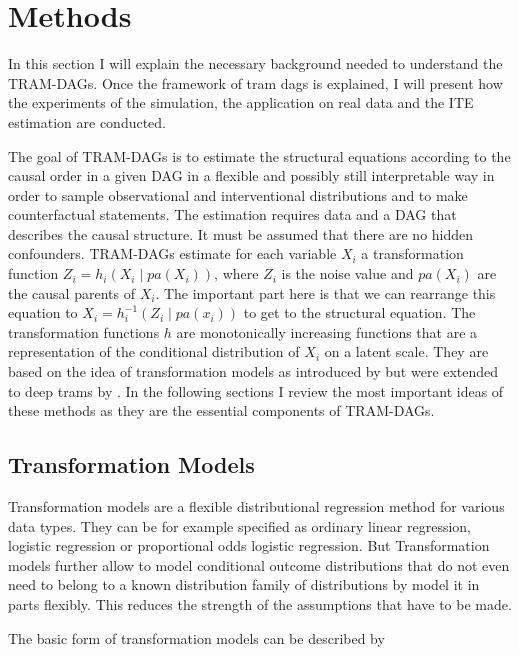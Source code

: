 



\chapter{Methods} 

In this section I will explain the necessary background needed to understand the TRAM-DAGs. Once the framework of tram dags is explained, I will present how the experiments of the simulation, the application on real data and the ITE estimation are conducted.


The goal of TRAM-DAGs is to estimate the structural equations according to the causal order in a given DAG in a flexible and possibly still interpretable way in order to sample observational and interventional distributions and to make counterfactual statements. The estimation requires data and a DAG that describes the causal structure. It must be assumed that there are no hidden confounders. TRAM-DAGs estimate for each variable $X_i$ a transformation function $Z_i = h_i(X_i \mid pa(X_i))$, where $Z_i$ is the noise value and $pa(X_i)$ are the causal parents of $X_i$. The important part here is that we can rearrange this equation to $X_i = h_i^{-1}(Z_i \mid pa(x_i))$ to get to the structural equation. The transformation functions $h$ are monotonically increasing functions that are a representation of the conditional distribution of $X_i$ on a latent scale. They are based on the idea of transformation models as introduced by \citet{hothorn2014} but were extended to deep trams by \citet{sick2020}. In the following sections I review the most important ideas of these methods as they are the essential components of TRAM-DAGs.

\section{Transformation Models}


Transformation models are a flexible distributional regression method for various data types. They can be for example specified as ordinary linear regression, logistic regression or proportional odds logistic regression. But Transformation models further allow to model conditional outcome distributions that do not even need to belong to a known distribution family of distributions by model it in parts flexibly. This reduces the strength of the assumptions that have to be made.

The basic form of transformation models can be described by 

